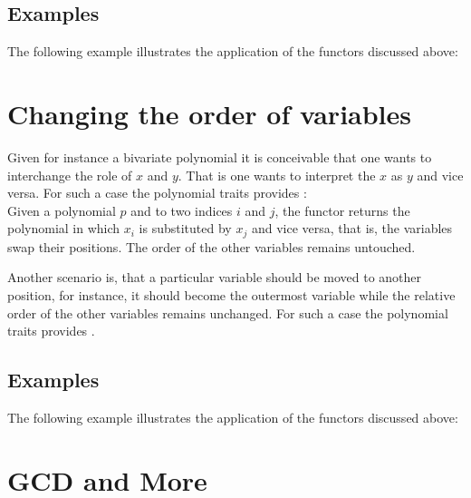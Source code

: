 \subsection{Examples}
The following example illustrates the application of the functors discussed 
above:

\section{Changing the order of variables}

Given for instance a bivariate polynomial it is conceivable that one wants to 
interchange the role of $x$ and $y$. That is one wants to interpret the 
$x$ as $y$ and vice versa.
For such a case the polynomial traits provides :\\
Given a polynomial $p$ and to two indices $i$ and $j$, 
the functor returns the polynomial in which $x_i$ is substituted by $x_j$ and 
vice versa, that is, the variables swap their positions.
The order of the other variables remains untouched. 

Another scenario is, that a particular variable should be moved to another 
position, for instance, it should become the outermost variable while the 
relative order of the other variables remains unchanged. 
For such a case the polynomial traits provides .

\subsection{Examples}
The following example illustrates the application of the functors discussed 
above:


\section{GCD and More}

